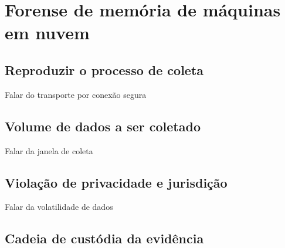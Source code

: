 \chapter{Forense de memória de máquinas em nuvem}

\section{Reproduzir o processo de coleta}

Falar do transporte por conexão segura

\section{Volume de dados a ser coletado}

Falar da janela de coleta

\section{Violação de privacidade e jurisdição}

Falar da volatilidade de dados

\section{Cadeia de custódia da evidência}
